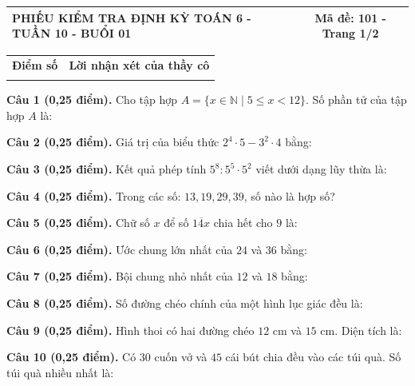 \documentclass[12pt,a4paper]{article}
\begin{document}
\pagestyle{empty}
\noindent
\begin{tabularx}{\linewidth}{|X|c|}
\hline
\textbf{PHIẾU KIỂM TRA ĐỊNH KỲ TOÁN 6 - TUẦN 10 - BUỔI 01} & \textbf{Mã đề: 101 - Trang 1/2} \\
\hline
\end{tabularx}

\vspace{1.0mm}

\noindent
\begin{tabularx}{\linewidth}{|p{3.2cm}|X|}
\hline
\centering\textbf{Điểm số} & \centering\textbf{Lời nhận xét của thầy cô} \tabularnewline
\rule{0pt}{1.8cm} & \\
\hline
\end{tabularx}

\vspace{1.0mm}

\noindent\textbf{Câu 1 (0,25 điểm).} Cho tập hợp $A = \{x \in \mathbb{N} \mid 5 \le x < 12\}$. Số phần tử của tập hợp $A$ là: \par\vspace{0.25mm}
\noindent\textbf{Câu 2 (0,25 điểm).} Giá trị của biểu thức $2^4 \cdot 5 - 3^2 \cdot 4$ bằng: \par\vspace{0.25mm}
\noindent\textbf{Câu 3 (0,25 điểm).} Kết quả phép tính $5^8 : 5^5 \cdot 5^2$ viết dưới dạng lũy thừa là: \par\vspace{0.25mm}
\noindent\textbf{Câu 4 (0,25 điểm).} Trong các số: $13, 19, 29, 39$, số nào là hợp số? \par\vspace{0.25mm}
\noindent\textbf{Câu 5 (0,25 điểm).} Chữ số $x$ để số $\overline{14x}$ chia hết cho $9$ là: \par\vspace{0.25mm}
\noindent\textbf{Câu 6 (0,25 điểm).} Ước chung lớn nhất của $24$ và $36$ bằng: \par\vspace{0.25mm}
\noindent\textbf{Câu 7 (0,25 điểm).} Bội chung nhỏ nhất của $12$ và $18$ bằng: \par\vspace{0.25mm}
\noindent\textbf{Câu 8 (0,25 điểm).} Số đường chéo chính của một hình lục giác đều là: \par\vspace{0.25mm}
\noindent\textbf{Câu 9 (0,25 điểm).} Hình thoi có hai đường chéo $12\text{ cm}$ và $15\text{ cm}$. Diện tích là: \par\vspace{0.25mm}
\noindent\textbf{Câu 10 (0,25 điểm).} Có $30$ cuốn vở và $45$ cái bút chia đều vào các túi quà. Số túi quà nhiều nhất là: \par\vspace{0.25mm}
\end{document}
